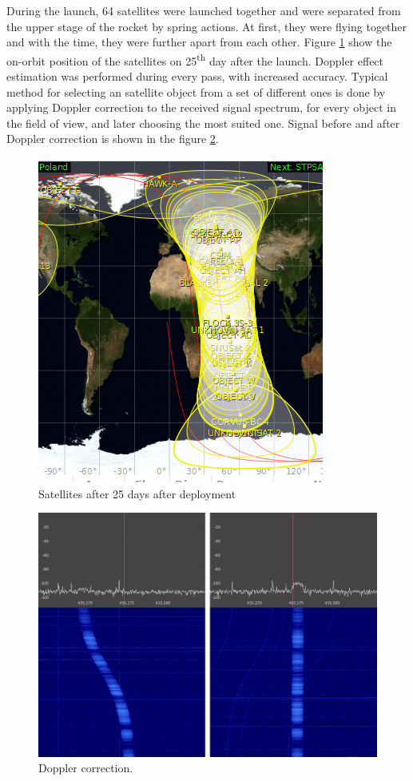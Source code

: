 During the launch, \si{64} satellites were launched together and were separated from the upper stage of the rocket by spring actions. At first, they were flying together and with the time, they were further apart from each other. Figure \ref{25_days} show the on-orbit position of the satellites on \si{25^{th}} day after the launch. Doppler effect estimation was performed during every pass, with increased accuracy. Typical method for selecting an satellite object from a set of different ones is done by applying Doppler correction to the received signal spectrum, for every object in the field of view, and later choosing the most suited one. Signal before and after Doppler correction is shown in the figure \ref{Doppler_correction_gqrx}.

\begin{figure}[H]
    \centering
    \includegraphics[width=0.4\paperwidth]{img/9/25_days.png}
    \caption{Satellites after \si{25} days after deployment}
    \label{25_days}
\end{figure}

\begin{figure}[H]
    \centering
    \includegraphics[width=0.5\paperwidth]{img/9/doppler_correction.png}
    \caption{Doppler correction.}
    \label{Doppler_correction_gqrx}
\end{figure}

